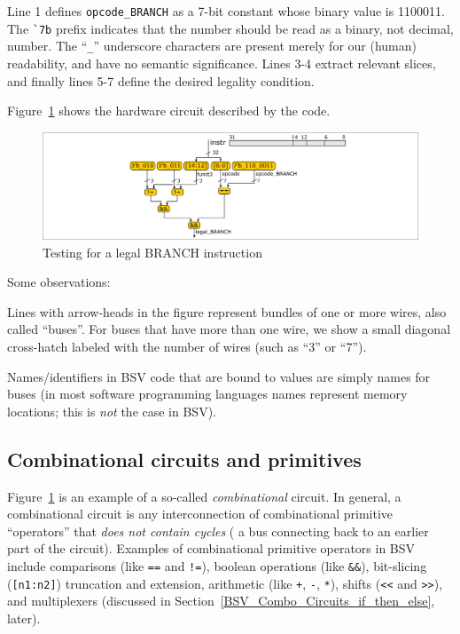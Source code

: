 Line 1 defines \verb|opcode_BRANCH| as a 7-bit constant whose binary
value is 1100011.  The \verb|`7b| prefix indicates that the number
should be read as a binary, not decimal, number.  The ``\verb|_|''
underscore characters are present merely for our (human) readability,
and have no semantic significance.  Lines 3-4 extract relevant slices,
and finally lines 5-7 define the desired legality condition.

Figure~\ref{Fig_Combo_Is_Legal_BRANCH} shows the hardware circuit described by the code.
\begin{figure}[htbp]
  \centerline{\includegraphics[width=6in,angle=0]{Figures/Fig_Combo_Is_Legal_BRANCH}}
  \caption{\label{Fig_Combo_Is_Legal_BRANCH}Testing for a legal BRANCH instruction}
\end{figure}
Some observations:
\begin{tightlist}

 \item Lines with arrow-heads in the figure represent bundles of one
   or more wires, also called ``buses''.  For buses that have more
   than one wire, we show a small diagonal cross-hatch labeled with
   the number of wires (such as ``3'' or ``7'').

 \item Names/identifiers in BSV code that are bound to values are
   simply names for buses (in most software programming languages
   names represent memory locations; this is \emph{not} the case in
   BSV).

\end{tightlist}


\subsection{Combinational circuits and primitives}


Figure~\ref{Fig_Combo_Is_Legal_BRANCH} is an example of a so-called
\emph{combinational} circuit.  In general, a combinational circuit is
any interconnection of combinational primitive ``operators'' that
\emph{does not contain cycles} ({\ie} a bus connecting back to an
earlier part of the circuit).  Examples of combinational primitive
operators in BSV include comparisons (like \verb|==| and \verb|!=|),
boolean operations (like \verb|&&|), bit-slicing (\verb|[n1:n2]|)
truncation and extension, arithmetic (like \verb|+|, \verb|-|,
\verb|*|), shifts (\verb|<<| and \verb|>>|), and multiplexers
(discussed in Section~\ref{BSV_Combo_Circuits_if_then_else}, later).

